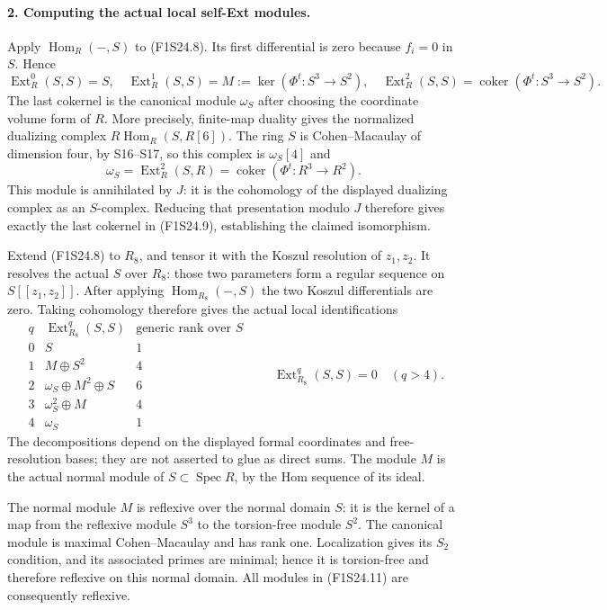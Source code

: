 \paragraph{2. Computing the actual local self-Ext modules.}
Apply $\operatorname{Hom}_R(-,S)$ to (F1S24.8). Its first
differential is zero because $f_i=0$ in $S$. Hence
\[
 \operatorname{Ext}_R^0(S,S)=S,\quad
 \operatorname{Ext}_R^1(S,S)=M:=\ker(\Phi^t:S^3\to S^2),\quad
 \operatorname{Ext}_R^2(S,S)=\operatorname{coker}(\Phi^t:S^3\to S^2).
 \tag{F1S24.9}
\]
The last cokernel is the canonical module $\omega_S$ after choosing
the coordinate volume form of $R$. More precisely, finite-map
duality gives the normalized dualizing complex
$R\operatorname{Hom}_R(S,R[6])$. The ring $S$ is Cohen--Macaulay
of dimension four, by S16--S17, so this complex is
$\omega_S[4]$ and
\[
 \omega_S=\operatorname{Ext}_R^2(S,R)
          =\operatorname{coker}(\Phi^t:R^3\to R^2).
 \tag{F1S24.10}
\]
This module is annihilated by $J$: it is the cohomology of the
displayed dualizing complex as an $S$-complex. Reducing that
presentation modulo $J$ therefore gives exactly the last cokernel
in (F1S24.9), establishing the claimed isomorphism.

Extend (F1S24.8) to $R_8$, and tensor it with the Koszul resolution
of $z_1,z_2$. It resolves the actual $S$ over $R_8$: those two
parameters form a regular sequence on $S[[z_1,z_2]]$.
After applying $\operatorname{Hom}_{R_8}(-,S)$ the two Koszul
differentials are zero. Taking cohomology therefore gives the
actual local identifications
\[
\begin{array}{c|c|c}
q&\operatorname{Ext}_{R_8}^q(S,S)&\text{generic rank over }S\\ \hline
0&S&1\\
1&M\oplus S^2&4\\
2&\omega_S\oplus M^2\oplus S&6\\
3&\omega_S^2\oplus M&4\\
4&\omega_S&1
\end{array}
\qquad\operatorname{Ext}_{R_8}^{q}(S,S)=0\quad(q>4).
 \tag{F1S24.11}
\]
The decompositions depend on the displayed formal coordinates and
free-resolution bases; they are not asserted to glue as direct sums.
The module $M$ is the actual normal module of $S\subset\operatorname{Spec}R$,
by the Hom sequence of its ideal.

The normal module $M$ is reflexive over the normal domain $S$:
it is the kernel of a map from the reflexive module $S^3$ to
the torsion-free module $S^2$. The canonical module is maximal
Cohen--Macaulay and has rank one. Localization gives its $S_2$
condition, and its associated primes are minimal; hence it is
torsion-free and therefore reflexive on this normal domain.
All modules in (F1S24.11) are consequently reflexive.

